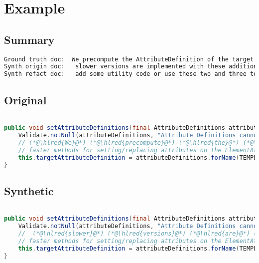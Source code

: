 \documentclass[11pt]{article}
\DeclareRobustCommand{\hlred}[1]{{\sethlcolor{YellowOrange}\hl{#1}}}
\begin{document}
\pagebreak
\section{Example}
\subsection{Summary}

\begin{lstlisting}[language=java]
Ground truth doc:  We precompute the AttributeDefinition of the target attribute in order to being able to use much
Synth origin doc:   slower versions are implemented with these additional methods which call additional methods for avoiding duplicate values
Synth refact doc:   add some utility code or use these two and three to use generic types to allow
\end{lstlisting}

\subsection{Original}
\begin{lstlisting}[language=java]

public void setAttributeDefinitions(final AttributeDefinitions attributeDefinitions) {
    Validate.notNull(attributeDefinitions, "Attribute Definitions cannot be null");
    // (*@\hlred{We}@*) (*@\hlred{precompute}@*) (*@\hlred{the}@*) (*@\hlred{AttributeDefinition}@*) (*@\hlred{of}@*) (*@\hlred{the}@*) (*@\hlred{target}@*) (*@\hlred{attribute}@*) (*@\hlred{in}@*) (*@\hlred{order}@*) (*@\hlred{to}@*) (*@\hlred{being}@*) (*@\hlred{able}@*) (*@\hlred{to}@*) (*@\hlred{use}@*) (*@\hlred{much}@*)
    // faster methods for setting/replacing attributes on the ElementAttributes implementation
    this.targetAttributeDefinition = attributeDefinitions.forName(TEMPLATE_MODE, this.targetAttributeCompleteName);
}
\end{lstlisting}
\subsection{Synthetic}

\begin{lstlisting}[language=java]

public void setAttributeDefinitions(final AttributeDefinitions attributeDefinitions) {
    Validate.notNull(attributeDefinitions, "Attribute Definitions cannot be null");
    //  (*@\hlred{slower}@*) (*@\hlred{versions}@*) (*@\hlred{are}@*) (*@\hlred{implemented}@*) (*@\hlred{with}@*) (*@\hlred{these}@*) (*@\hlred{additional}@*) (*@\hlred{methods}@*) (*@\hlred{which}@*) (*@\hlred{call}@*) (*@\hlred{additional}@*) (*@\hlred{methods}@*) (*@\hlred{for}@*) (*@\hlred{avoiding}@*) (*@\hlred{duplicate}@*) (*@\hlred{values}@*)
    // faster methods for setting/replacing attributes on the ElementAttributes implementation
    this.targetAttributeDefinition = attributeDefinitions.forName(TEMPLATE_MODE, this.targetAttributeCompleteName);
}
\end{lstlisting}
\end{document}
